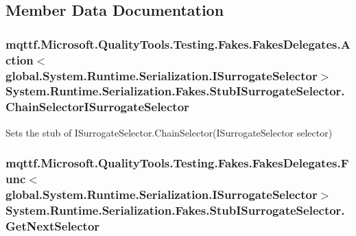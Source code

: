 \subsection{Member Data Documentation}
\hypertarget{class_system_1_1_runtime_1_1_serialization_1_1_fakes_1_1_stub_i_surrogate_selector_a764c623dafad1b4f337daacbc10bb5c5}{
\subsubsection[{Chain\-Selector\-I\-Surrogate\-Selector}]{\setlength{\rightskip}{0pt plus 5cm}mqttf.\-Microsoft.\-Quality\-Tools.\-Testing.\-Fakes.\-Fakes\-Delegates.\-Action$<$global.\-System.\-Runtime.\-Serialization.\-I\-Surrogate\-Selector$>$ System.\-Runtime.\-Serialization.\-Fakes.\-Stub\-I\-Surrogate\-Selector.\-Chain\-Selector\-I\-Surrogate\-Selector}}\label{class_system_1_1_runtime_1_1_serialization_1_1_fakes_1_1_stub_i_surrogate_selector_a764c623dafad1b4f337daacbc10bb5c5}


Sets the stub of I\-Surrogate\-Selector.\-Chain\-Selector(\-I\-Surrogate\-Selector selector)

\hypertarget{class_system_1_1_runtime_1_1_serialization_1_1_fakes_1_1_stub_i_surrogate_selector_ae5ba6bbb406ff919d6a94d8496635c60}{
\subsubsection[{Get\-Next\-Selector}]{\setlength{\rightskip}{0pt plus 5cm}mqttf.\-Microsoft.\-Quality\-Tools.\-Testing.\-Fakes.\-Fakes\-Delegates.\-Func$<$global.\-System.\-Runtime.\-Serialization.\-I\-Surrogate\-Selector$>$ System.\-Runtime.\-Serialization.\-Fakes.\-Stub\-I\-Surrogate\-Selector.\-Get\-Next\-Selector}}\label{class_system_1_1_runtime_1_1_serialization_1_1_fakes_1_1_stub_i_surrogate_selector_ae5ba6bbb406ff919d6a94d8496635c60}


